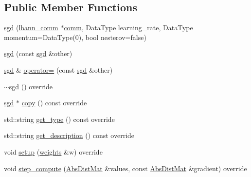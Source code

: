 \subsection*{Public Member Functions}
\begin{DoxyCompactItemize}
\item 
\hyperlink{classlbann_1_1sgd_a73baa574a5129872fe25f2a419c86baa}{sgd} (\hyperlink{classlbann_1_1lbann__comm}{lbann\+\_\+comm} $\ast$\hyperlink{file__io_8cpp_ab048c6f9fcbcfaa57ce68b00263dbebe}{comm}, Data\+Type learning\+\_\+rate, Data\+Type momentum=Data\+Type(0), bool nesterov=false)
\item 
\hyperlink{classlbann_1_1sgd_ac0a74200f44b45ced9b44e3b6349581a}{sgd} (const \hyperlink{classlbann_1_1sgd}{sgd} \&other)
\item 
\hyperlink{classlbann_1_1sgd}{sgd} \& \hyperlink{classlbann_1_1sgd_ad3949e74505cd25b267dbdd5b510a83f}{operator=} (const \hyperlink{classlbann_1_1sgd}{sgd} \&other)
\item 
\hyperlink{classlbann_1_1sgd_a0d0410edb1ca4510509cc9a5de105b4f}{$\sim$sgd} () override
\item 
\hyperlink{classlbann_1_1sgd}{sgd} $\ast$ \hyperlink{classlbann_1_1sgd_a91572d383ad42584bf917e7d62bebe82}{copy} () const override
\item 
std\+::string \hyperlink{classlbann_1_1sgd_ad24efbeadae61890d07fa9e95aa91c61}{get\+\_\+type} () const override
\item 
std\+::string \hyperlink{classlbann_1_1sgd_a2022661b9ef83e418a0a980207cb231e}{get\+\_\+description} () const override
\item 
void \hyperlink{classlbann_1_1sgd_a616c3cfd457ae1e771710b481b4c1bbb}{setup} (\hyperlink{classlbann_1_1weights}{weights} \&w) override
\item 
void \hyperlink{classlbann_1_1sgd_a083a44b456939b58f531cea1fde2378b}{step\+\_\+compute} (\hyperlink{base_8hpp_a9a697a504ae84010e7439ffec862b470}{Abs\+Dist\+Mat} \&values, const \hyperlink{base_8hpp_a9a697a504ae84010e7439ffec862b470}{Abs\+Dist\+Mat} \&gradient) override
\end{DoxyCompactItemize}
